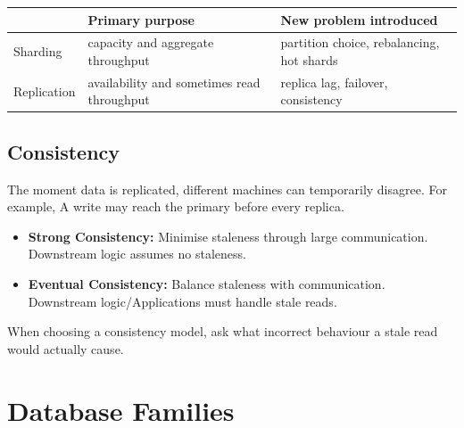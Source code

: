 \begin{table}[htbp]
    \centering
    \begin{tabularx}{\linewidth}{@{}lXX@{}}
    \toprule
     & \textbf{Primary purpose} & \textbf{New problem introduced} \\
    \midrule
    Sharding & capacity and aggregate throughput & partition choice, rebalancing, hot shards \\
    Replication & availability and sometimes read throughput & replica lag, failover, consistency \\
    \bottomrule
    \end{tabularx}
\end{table}

\subsection{Consistency}
The moment data is replicated, different machines can temporarily disagree.
For example, A write may reach the primary before every replica.
\begin{itemize}
    \item \textbf{Strong Consistency:} Minimise staleness through large communication. Downstream logic assumes no staleness. 
    \item \textbf{Eventual Consistency:} Balance staleness with communication. Downstream logic/Applications must handle stale reads.
\end{itemize}

\begin{calloutpractical}
    When choosing a consistency model, ask what incorrect behaviour a stale read would actually cause.
\end{calloutpractical}



\section{Database Families}
\label{sec:database-families}

